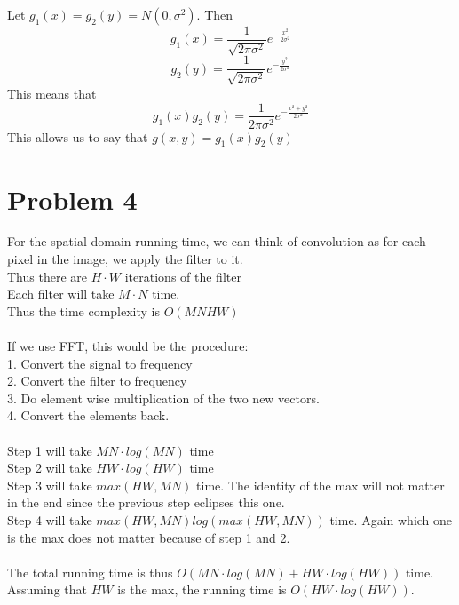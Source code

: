 \documentclass[11pt,psfig]{article}
\begin{document}
Let $g_1(x) = g_2(y) = N(0,\sigma^2)$. Then
\[
g_1(x) = \frac{1}{\sqrt{2\pi \sigma^2}} e^{-\frac{x^2}{2\sigma^2}}
\]
\[
g_2(y) = \frac{1}{\sqrt{2\pi \sigma^2}} e^{-\frac{y^2}{2\sigma^2}}
\]
This means that
\[
g_1(x)g_2(y) = \frac{1}{2\pi \sigma^2} e^{-\frac{x^2 + y^2}{2\sigma^2}}
\]
This allows us to say that $g(x,y) = g_1(x)g_2(y)$

\section*{Problem 4}

For the spatial domain running time, we can think of convolution as for each pixel in the image, we apply the filter to it. \\
Thus there are $H \cdot W$ iterations of the filter\\
Each filter will take $M \cdot N$ time. \\
Thus the time complexity is $O(MNHW)$\\
\\
If we use FFT, this would be the procedure:\\
1. Convert the signal to frequency\\
2. Convert the filter to frequency \\
3. Do element wise multiplication of the two new vectors. \\
4. Convert the elements back. \\
\\
Step 1 will take $MN \cdot log(MN)$ time\\
Step 2 will take $HW \cdot log(HW)$ time\\
Step 3 will take $max(HW,MN)$ time. The identity of the max will not matter in the end since the previous step eclipses this one. \\
Step 4 will take $max(HW,MN) log( max(HW, MN) )$ time. Again which one is the max does not matter because of step 1 and 2. \\
\\
The total running time is thus $O(MN \cdot log(MN) + HW \cdot log(HW) )$ time. \\
Assuming that $HW$ is the max, the running time is $O(HW \cdot log(HW))$. 

\end{document}
